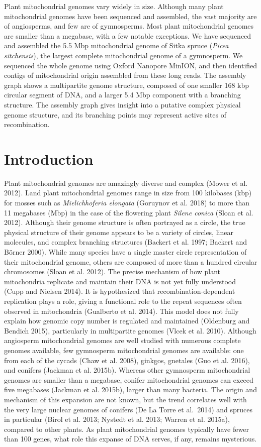 \documentclass[
  12pt,
  oneside,
  openany]{book}
\begin{document}
Plant mitochondrial genomes vary widely in size. Although many plant mitochondrial genomes have been sequenced and assembled, the vast majority are of angiosperms, and few are of gymnosperms. Most plant mitochondrial genomes are smaller than a megabase, with a few notable exceptions. We have sequenced and assembled the 5.5 Mbp mitochondrial genome of Sitka spruce (\emph{Picea sitchensis}), the largest complete mitochondrial genome of a gymnosperm. We sequenced the whole genome using Oxford Nanopore MinION, and then identified contigs of mitochondrial origin assembled from these long reads. The assembly graph shows a multipartite genome structure, composed of one smaller 168 kbp circular segment of DNA, and a larger 5.4 Mbp component with a branching structure. The assembly graph gives insight into a putative complex physical genome structure, and its branching points may represent active sites of recombination.

\hypertarget{introduction-5}{%
\section{Introduction}\label{introduction-5}}

Plant mitochondrial genomes are amazingly diverse and complex (Mower et al. 2012). Land plant mitochondrial genomes range in size from 100 kilobases (kbp) for mosses such as \emph{Mielichhoferia elongata} (Goruynov et al. 2018) to more than 11 megabases (Mbp) in the case of the flowering plant \emph{Silene conica} (Sloan et al. 2012). Although their genome structure is often portrayed as a circle, the true physical structure of their genome appears to be a variety of circles, linear molecules, and complex branching structures (Backert et al. 1997; Backert and Börner 2000). While many species have a single master circle representation of their mitochondrial genome, others are composed of more than a hundred circular chromosomes (Sloan et al. 2012). The precise mechanism of how plant mitochondria replicate and maintain their DNA is not yet fully understood (Cupp and Nielsen 2014). It is hypothesized that recombination-dependent replication plays a role, giving a functional role to the repeat sequences often observed in mitochondria (Gualberto et al. 2014). This model does not fully explain how genomic copy number is regulated and maintained (Oldenburg and Bendich 2015), particularly in multipartite genomes (Vlcek et al. 2010). Although angiosperm mitochondrial genomes are well studied with numerous complete genomes available, few gymnosperm mitochondrial genomes are available: one from each of the cycads (Chaw et al. 2008), ginkgos, gnetales (Guo et al. 2016), and conifers (Jackman et al. 2015b). Whereas other gymnosperm mitochondrial genomes are smaller than a megabase, conifer mitochondrial genomes can exceed five megabases (Jackman et al. 2015b), larger than many bacteria. The origin and mechanism of this expansion are not known, but the trend correlates well with the very large nuclear genomes of conifers (De La Torre et al.~2014) and spruces in particular (Birol et al. 2013; Nystedt et al. 2013; Warren et al. 2015a), compared to other plants. As plant mitochondrial genomes typically have fewer than 100 genes, what role this expanse of DNA serves, if any, remains mysterious.
\end{document}
